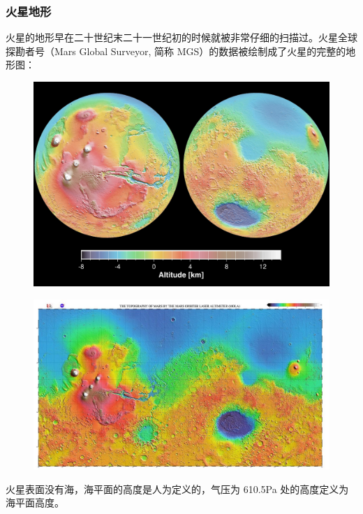 \documentclass[letterpaper,10pt]{sphinxmanual}
\begin{document}
\subsubsection{火星地形}
\label{mars:id8}
火星的地形早在二十世纪末二十一世纪初的时候就被非常仔细的扫描过。火星全球探勘者号（Mars Global Surveyor, 简称 MGS）的数据被绘制成了火星的完整的地形图：
\begin{figure}[htbp]
\centering

\includegraphics{PIA02820.jpg}
\end{figure}
\begin{figure}[htbp]
\centering

\includegraphics{1024px-Mars_topography_MOLA_dataset_HiRes.jpg}
\end{figure}

火星表面没有海，海平面的高度是人为定义的，气压为 610.5Pa 处的高度定义为海平面高度。
\end{document}
